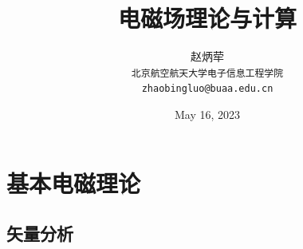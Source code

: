 \documentclass{article}
\numberwithin{equation}{section}
\begin{document}
\newcommand\tbbint{{-\mkern -16mu\int}}
\newcommand\tbint{{\mathchar '26\mkern -14mu\int}}
\newcommand\dbbint{{-\mkern -19mu\int}}
\newcommand\dbint{{\mathchar '26\mkern -18mu\int}}
\newcommand\bint{
{\mathchoice{\dbint}{\tbint}{\tbint}{\tbint}}
}
\newcommand\bbint{
{\mathchoice{\dbbint}{\tbbint}{\tbbint}{\tbbint}}
}

\setlength{\baselineskip}{15pt}
\setlength{\abovedisplayskip}{1ex}
\setlength{\belowdisplayskip}{1ex}

\date{May 16, 2023}

\author{赵炳荦\\\texttt{北京航空航天大学\quad 电子信息工程学院}\\\texttt{zhaobingluo@buaa.edu.cn}}
\title{\huge\textsf{电磁场理论与计算}}
\maketitle
\tableofcontents

\newpage
\section{\textsf{基本电磁理论}}
\subsection{矢量分析}
\end{document}
